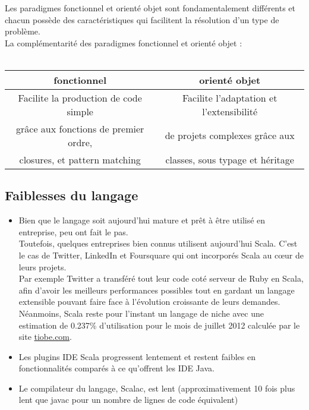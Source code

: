 Les paradigmes fonctionnel et orienté objet sont fondamentalement différents
et chacun possède des caractéristiques qui facilitent la résolution d'un type
de problème.\\
La complémentarité des paradigmes fonctionnel et orienté objet :\\\\
\begin{tabular}{|c|c|}
  \hline
  \textbf{fonctionnel} & \textbf{orienté objet}\\
  \hline
  Facilite la production de code simple & Facilite l'adaptation et l'extensibilité\\
  grâce aux fonctions de premier ordre, & de projets complexes grâce aux\\
  closures, et pattern matching & classes, sous typage et héritage \\
  \hline
\end{tabular}


\subsection{Faiblesses du langage}
\begin{itemize}
\item[\textbullet] Bien que le langage soit aujourd'hui mature et prêt à être utilisé en
  entreprise, peu ont fait le pas.\\
  Toutefois, quelques entreprises bien connus utilisent aujourd'hui Scala.
  C'est le cas de Twitter, LinkedIn et Foursquare qui ont incorporés Scala au
  cœur de leurs projets.\\
  Par exemple Twitter a transféré tout leur code coté serveur de Ruby en Scala,
  afin d'avoir les meilleurs performances possibles tout en gardant un langage
  extensible pouvant faire face à l'évolution croissante de leurs demandes.\\

  Néanmoins, Scala reste pour l'instant un langage de niche avec une estimation
  de 0.237\% d'utilisation pour le mois de juillet 2012 calculée par le site
  \href{http://www.tiobe.com/index.php/content/paperinfo/tpci/index.html}{tiobe.com}.\\
\item[\textbullet] Les plugins IDE Scala progressent lentement et restent
  faibles en fonctionnalités comparés à ce qu'offrent les IDE Java.\\
\item[\textbullet] Le compilateur du langage, Scalac, est lent
  (approximativement 10 fois plus lent que javac pour un nombre de lignes de
  code équivalent)\\
\end{itemize}

